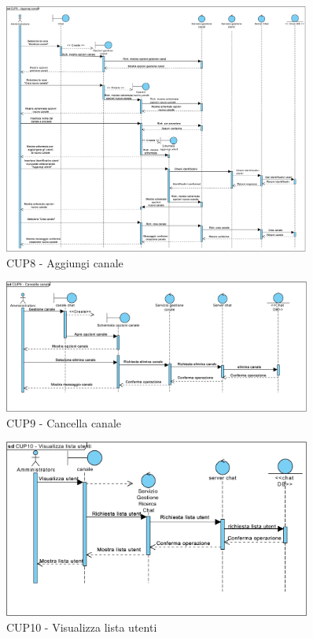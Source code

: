 \begin{figure}
	\centering
	\includegraphics[width=0.9\textwidth]{imgs/gruppo6/sequence/CUP8_aggiungi_canale.pdf}
	\caption{CUP8 - Aggiungi canale}
	\label{fig:seq-cup8}
\end{figure}

\begin{figure}
	\centering
	\includegraphics[width=0.9\textwidth]{imgs/gruppo6/sequence/CUP9_cancella_canale.pdf}
	\caption{CUP9 - Cancella canale}
	\label{fig:seq-cup9}
\end{figure}

\begin{figure}
	\centering
	\includegraphics[width=0.9\textwidth]{imgs/gruppo6/sequence/CUP10_visualizza_lista_utenti.pdf}
	\caption{CUP10 - Visualizza lista utenti}
	\label{fig:seq-cup10}
\end{figure}

